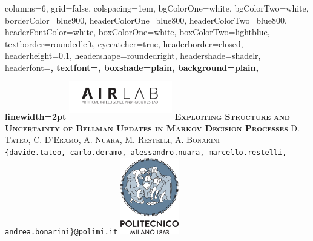 \documentclass[portrait,a0paper,fontscale=0.312]{baposter}
\begin{document}
\begin{poster}%
  {
  columns=6,
  grid=false,
  colspacing=1em,
  bgColorOne=white,
  bgColorTwo=white,
  borderColor=blue900,
  headerColorOne=blue800,
  headerColorTwo=blue800,
  headerFontColor=white,
  boxColorOne=white,
  boxColorTwo=lightblue,
  textborder=roundedleft,
  eyecatcher=true,
  headerborder=closed,
  headerheight=0.1\textheight,
  headershape=roundedright,
  headershade=shadelr,
  headerfont=\Large\bf\textsc, %
  textfont={\setlength{\parindent}{1.5em}},
  boxshade=plain,
  background=plain,
  linewidth=2pt
  }
  {\includegraphics[height=2cm, width=4.5cm]{./pics/airlab-logo-new.pdf}} 
  {\bf\textsc{Exploiting Structure and Uncertainty of Bellman Updates in Markov Decision Processes}\vspace{0.1em}}
  {\textsc{D. Tateo, C. D'Eramo, A. Nuara, M. Restelli, A. Bonarini}\\ {\normalsize \texttt{\{davide.tateo, carlo.deramo, alessandro.nuara, marcello.restelli, andrea.bonarini\}@polimi.it}}}
  {%
    \includegraphics[height=9.0em]{./pics/polilogo/logoPoliBlue_poster.png}
  }

    \newcommand{\colouredcircle}{%
      \tikz{\useasboundingbox (-0.2em,-0.32em) rectangle(0.2em,0.32em); \draw[draw=black,fill=lightblue,line width=0.03em] (0,0) circle(0.18em);}}


\end{poster}
\end{document}
